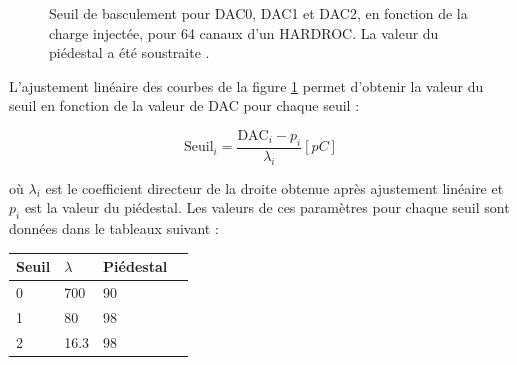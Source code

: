 \begin{figure}[ht!]
	\centering
	\hfill
	\hfill
	\caption{Seuil de basculement pour DAC0, DAC1 et DAC2, en fonction de la charge injectée, pour \num{64} canaux d'un HARDROC. La valeur du piédestal a été soustraite \cite{kieffer:tel-00751999}.}
	\label{seuils}
\end{figure}%

L'ajustement linéaire des courbes de la figure \ref{seuils} permet d'obtenir la valeur du seuil en fonction de la valeur de DAC pour chaque seuil :

\begin{equation}
\mbox{Seuil}_{i}=\frac{\mbox{DAC}_{i}-p_{i}}{\lambda_{i}} [pC]
\label{equationn}
\end{equation}

où $\lambda_{i}$ est le coefficient directeur de la droite obtenue après ajustement linéaire et $p_{i}$ est la valeur du piédestal. Les valeurs de ces paramètres pour chaque seuil sont données dans le tableaux suivant :

\begin{table}[H]
	\centering
\begin{tabular}{|O|O|O|N}
	\hline 
	Seuil & $\lambda$ & Piédestal \\ 
	\hline 
	\num{0}&\num{700} &\num{90} \\ 
	\hline 
	\num{1}& \num{80} & \num{98} \\ 
	\hline 
	\num{2}&\num{16.3} &\num{98} \\ 
	\hline 
\end{tabular} 
\end{table}

